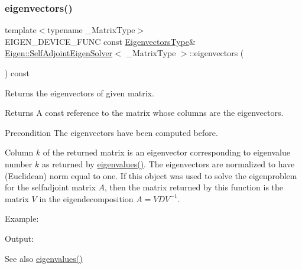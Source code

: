 \subsubsection{\texorpdfstring{eigenvectors()}{eigenvectors()}}
{\footnotesize\ttfamily template$<$typename \+\_\+\+Matrix\+Type$>$ \\
E\+I\+G\+E\+N\+\_\+\+D\+E\+V\+I\+C\+E\+\_\+\+F\+U\+NC const \mbox{\hyperlink{class_eigen_1_1_matrix}{Eigenvectors\+Type}}\& \mbox{\hyperlink{class_eigen_1_1_self_adjoint_eigen_solver}{Eigen\+::\+Self\+Adjoint\+Eigen\+Solver}}$<$ \+\_\+\+Matrix\+Type $>$\+::eigenvectors (\begin{DoxyParamCaption}{ }\end{DoxyParamCaption}) const\hspace{0.3cm}{\ttfamily [inline]}}



Returns the eigenvectors of given matrix. 

\begin{DoxyReturn}{Returns}
A const reference to the matrix whose columns are the eigenvectors.
\end{DoxyReturn}
\begin{DoxyPrecond}{Precondition}
The eigenvectors have been computed before.
\end{DoxyPrecond}
Column $ k $ of the returned matrix is an eigenvector corresponding to eigenvalue number $ k $ as returned by \mbox{\hyperlink{class_eigen_1_1_self_adjoint_eigen_solver_a8efab27e82aa6aa0ae0c64739238c2e0}{eigenvalues()}}. The eigenvectors are normalized to have (Euclidean) norm equal to one. If this object was used to solve the eigenproblem for the selfadjoint matrix $ A $, then the matrix returned by this function is the matrix $ V $ in the eigendecomposition $ A = V D V^{-1} $.

Example\+: 
\begin{DoxyCodeInclude}{0}
\end{DoxyCodeInclude}
 Output\+: 
\begin{DoxyVerbInclude}
\end{DoxyVerbInclude}


\begin{DoxySeeAlso}{See also}
\mbox{\hyperlink{class_eigen_1_1_self_adjoint_eigen_solver_a8efab27e82aa6aa0ae0c64739238c2e0}{eigenvalues()}} 
\end{DoxySeeAlso}
\mbox{\label{class_eigen_1_1_self_adjoint_eigen_solver_a56bd59b85a6f6f00ff7bff307ad0e015}} 
